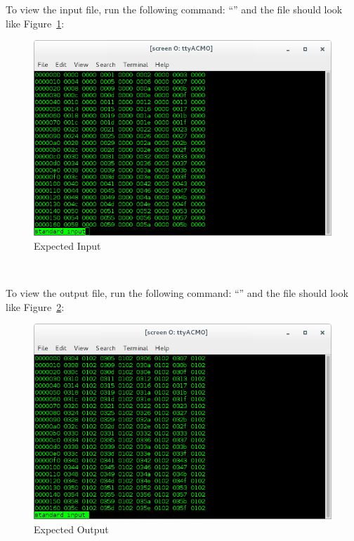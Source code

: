 \begin{minipage}{\linewidth}
To view the input file, run the following command: ``'' and the file should look like Figure~\ref{fig:inBias2}: \\ \medskip
\begin{figure}[H]
	\centerline{\includegraphics[scale=0.5]{zed_bias_input}}
	\caption{Expected Input}
	\label{fig:inBias2}
\end{figure}
\end{minipage}
~\\
\begin{minipage}{\linewidth}
To view the output file, run the following command: ``'' and the file should look like Figure~\ref{fig:outBias2}: \\
\begin{figure}[H]
	\centerline{\includegraphics[scale=0.5]{zed_bias_output}}
	\caption{Expected Output}
	\label{fig:outBias2}
\end{figure}
\end{minipage}
~\\

